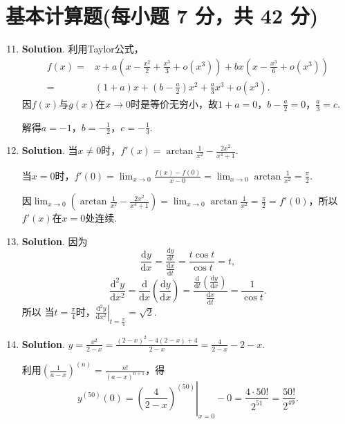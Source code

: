 \documentclass[../main.tex]{subfiles}
\begin{document}
\section{基本计算题(每小题 7 分，共 42 分)}
\begin{enumerate}
    \setcounter{enumi}{10}
    \item \textbf{Solution}. 利用Taylor公式，
          \[
              \begin{aligned}
                  f(x)= {} & x+a\left(x-\frac{x^2}{2}+\frac{x^3}{3}+o(x^{3})\right)+bx\left(x-\frac{x^3}{6}+o(x^{3})\right) \\
                  = {}     & (1+a)x+\left(b-\frac{a}{2}\right)x^{2}+\frac{a}{3}x^{3}+o(x^{3}).
              \end{aligned}
          \]
          因$f(x)$与$g(x)$在$x\to0$时是等价无穷小，故$1+a=0$，$b-\frac{a}{2}=0$，$\frac{a}{3}
              =c$.

          解得$a=-1$，$b=-\frac{1}{2}$，$c=-\frac{1}{3}$.

    \item \textbf{Solution}. 当$x\neq0$时，$f'(x)=\arctan\frac{1}{x^{2}}-\frac{2x^{2}}{x^{4}+1}$.

          当$x=0$时，$f'(0)=\lim_{x\to0}\frac{f(x)-f(0)}{x-0}=\lim_{x\to0}\arctan\frac{1}{x^{2}}
              =\frac{\pi}{2}$.

          因$\lim_{x\to0}\left(\arctan\frac{1}{x^{2}}-\frac{2x^{2}}{x^{4}+1}\right)=\lim
              _{x\to0}\arctan\frac{1}{x^{2}}=\frac{\pi}{2}=f'(0)$，所以$f'(x)$在$x=0$处连续.

    \item \textbf{Solution}. 因为
          \[
              \frac{\mathrm{d}y}{\mathrm{d}x}=\frac{\frac{\mathrm{d}y}{\mathrm{d}t}}{\frac{\mathrm{d}x}{\mathrm{d}t}}
              =\frac{t\cos t}{\cos t}=t,
          \]
          \[
              \frac{\mathrm{d}^{2} y}{\mathrm{d}x^{2}}=\frac{\mathrm{d}}{\mathrm{d}x}\left
              (\frac{\mathrm{d}y}{\mathrm{d}x}\right)=\frac{\frac{\mathrm{d}}{\mathrm{d}t}\left(\frac{\mathrm{d}y}{\mathrm{d}x}\right)}{\frac{\mathrm{d}x}{\mathrm{d}t}}
              =\frac{1}{\cos t}.
          \]
          所以
          当$t=\frac{\pi}{4}$时，$\left.\frac{\mathrm{d}^{2} y}{\mathrm{d}x^{2}}\right
              |_{t=\frac{\pi}{4}}=\sqrt{2}$.

    \item \textbf{Solution}. $y=\frac{x^{2}}{2-x}=\frac{(2-x)^{2}-4(2-x)+4}{2-x}
              =\frac{4}{2-x}-2-x$.

          利用$\left(\frac{1}{a-x}\right)^{(n)}=\frac{n!}{(a-x)^{n+1}}$，得
          \[
              y^{(50)}(0)=\left.\left(\frac{4}{2-x}\right)^{(50)}\right|_{x=0}-0=\frac{4\cdot50!}{2^{51}}
              =\frac{50!}{2^{49}}.
          \]


\end{enumerate}
\end{document}
